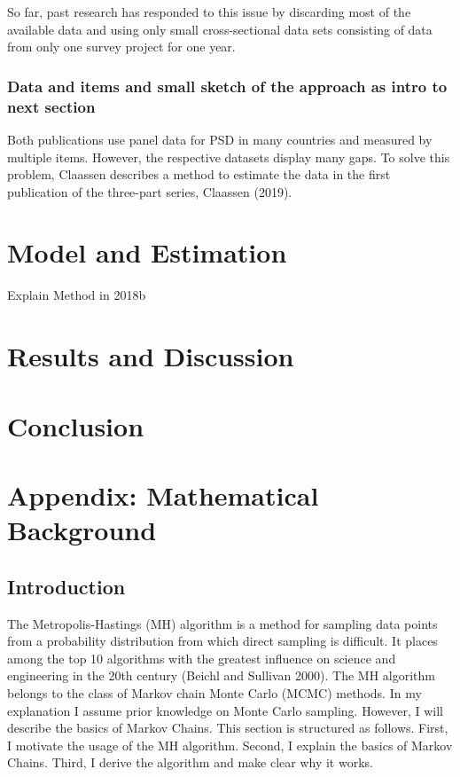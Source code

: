 \documentclass[12pt,english,a4paper,oneside]{article}
\theoremstyle{definition}
\theoremstyle{definition}
\theoremstyle{definition}
\theoremstyle{definition}
\theoremstyle{remark}
\begin{document}
So far, past research has responded to this issue by discarding most of the available data and using only small cross-sectional data sets consisting of data from only one survey project for one year.

\hypertarget{data-and-items-and-small-sketch-of-the-approach-as-intro-to-next-section}{%
\subsubsection{Data and items and small sketch of the approach as intro to next section}\label{data-and-items-and-small-sketch-of-the-approach-as-intro-to-next-section}}

Both publications use panel data for PSD in many countries and measured by multiple items. However, the respective datasets display many gaps. To solve this problem, Claassen describes a method to estimate the data in the first publication of the three-part series, Claassen (2019).

\hypertarget{model-and-estimation}{%
\section{Model and Estimation}\label{model-and-estimation}}

Explain Method in 2018b

\hypertarget{results-and-discussion}{%
\section{Results and Discussion}\label{results-and-discussion}}

\hypertarget{conclusion}{%
\section{Conclusion}\label{conclusion}}

\hypertarget{appendix-mathematical-background}{%
\section{Appendix: Mathematical Background}\label{appendix-mathematical-background}}

\hypertarget{introduction-1}{%
\subsection{Introduction}\label{introduction-1}}

The Metropolis-Hastings (MH) algorithm is a method for sampling data points from a probability distribution from which direct sampling is difficult. It places among the top 10 algorithms with the greatest influence on science and engineering in the 20th century (Beichl and Sullivan 2000). The MH algorithm belongs to the class of Markov chain Monte Carlo (MCMC) methods. In my explanation I assume prior knowledge on Monte Carlo sampling. However, I will describe the basics of Markov Chains. This section is structured as follows. First, I motivate the usage of the MH algorithm. Second, I explain the basics of Markov Chains. Third, I derive the algorithm and make clear why it works.
\end{document}
